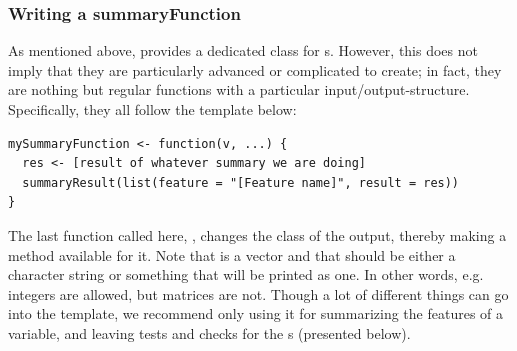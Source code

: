 \documentclass[article,shortnames]{jss}
\newcommand{\hl}[1]{\textcolor{magenta}{#1}}
\newcommand{\R}[1]{\code{#1}}
\begin{document}

\subsubsection{Writing a summaryFunction}
As mentioned above,  provides a dedicated class for
s. However, this does not imply that they are
particularly advanced or complicated to create; in fact, they are
nothing but regular functions with a particular
input/output-structure. Specifically, they all follow the template
below:
\begin{Verbatim}
mySummaryFunction <- function(v, ...) {
  res <- [result of whatever summary we are doing]
  summaryResult(list(feature = "[Feature name]", result = res))
}
\end{Verbatim}
The last function called here, \R{summaryResult()}, changes the class
of the output, thereby making a \R{print()} method available for it.
Note that  is a vector and that  should be either a
character string or something that will be printed as one. In other
words, e.g. integers are allowed, but matrices are not. Though a lot
of different things can go into the  template,
we recommend only using it for summarizing the features of a variable,
and leaving tests and checks for the s (presented
below).
\end{document}
